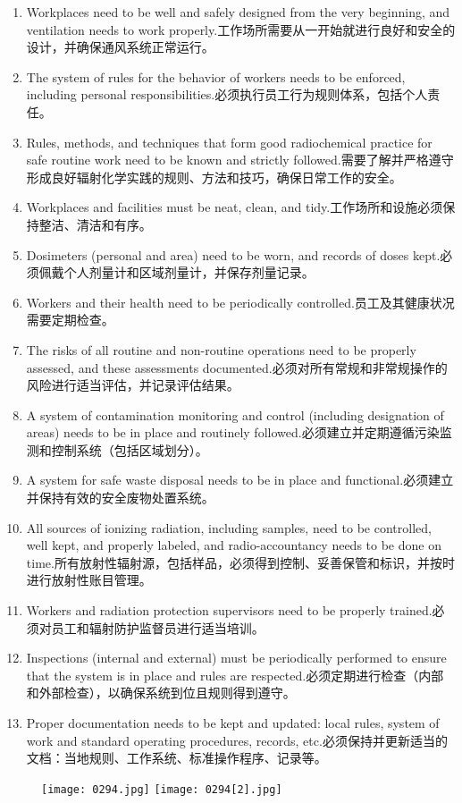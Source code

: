 \documentclass[dvipsnames, svgnames,a4paper,11pt]{article}
\begin{document}
\begin{enumerate}
  \item Workplaces need to be well and safely designed from the very beginning, and ventilation needs to work properly.工作场所需要从一开始就进行良好和安全的设计，并确保通风系统正常运行。
  \item The system of rules for the behavior of workers needs to be enforced, including personal responsibilities.必须执行员工行为规则体系，包括个人责任。
  \item Rules, methods, and techniques that form good radiochemical practice for safe routine work need to be known and strictly followed.需要了解并严格遵守形成良好辐射化学实践的规则、方法和技巧，确保日常工作的安全。
  \item Workplaces and facilities must be neat, clean, and tidy.工作场所和设施必须保持整洁、清洁和有序。
  \item Dosimeters (personal and area) need to be worn, and records of doses kept.必须佩戴个人剂量计和区域剂量计，并保存剂量记录。
  \item Workers and their health need to be periodically controlled.员工及其健康状况需要定期检查。
  \item The risks of all routine and non-routine operations need to be properly assessed, and these assessments documented.必须对所有常规和非常规操作的风险进行适当评估，并记录评估结果。
  \item A system of contamination monitoring and control (including designation of areas) needs to be in place and routinely followed.必须建立并定期遵循污染监测和控制系统（包括区域划分）。
  \item A system for safe waste disposal needs to be in place and functional.必须建立并保持有效的安全废物处置系统。
  \item All sources of ionizing radiation, including samples, need to be controlled, well kept, and properly labeled, and radio-accountancy needs to be done on time.所有放射性辐射源，包括样品，必须得到控制、妥善保管和标识，并按时进行放射性账目管理。
  \item Workers and radiation protection supervisors need to be properly trained.必须对员工和辐射防护监督员进行适当培训。
  \item Inspections (internal and external) must be periodically performed to ensure that the system is in place and rules are respected.必须定期进行检查（内部和外部检查），以确保系统到位且规则得到遵守。
  \item Proper documentation needs to be kept and updated: local rules, system of work and standard operating procedures, records, etc.必须保持并更新适当的文档：当地规则、工作系统、标准操作程序、记录等。
\end{enumerate}

\begin{figure}[h]
    \centering
    \texttt{[image: 0294.jpg]} \hspace{0.2in}
    \texttt{[image: 0294[2].jpg]}  
     \label{fig387}
\end{figure}
\end{document}
